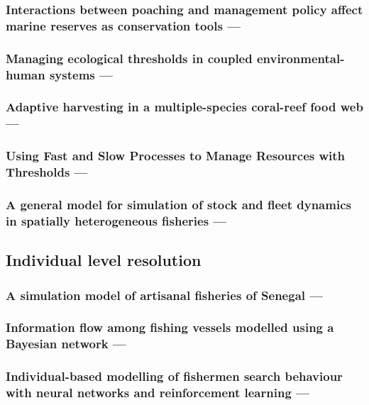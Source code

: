 \documentclass[12pt, a4paper]{article}
\begin{document}
\subsubsection{Interactions between poaching and management policy affect marine reserves as conservation tools --- \cite{SethiHilborn2008}}

\subsubsection{Managing ecological thresholds in coupled environmental-human systems --- \cite{Horanetal2011}}

\subsubsection{Adaptive harvesting in a multiple-species coral-reef food web --- \cite{Kramer2008}}

\subsubsection{Using Fast and Slow Processes to Manage Resources with Thresholds --- \cite{Crepin2007}}

\subsubsection{A general model for simulation of stock and fleet dynamics in spatially heterogeneous fisheries --- \cite{HilbornWalters1987}}

\subsection{Individual level resolution}

\subsubsection{A simulation model of artisanal fisheries of Senegal --- \cite{LaloeSamba1991}}

\subsubsection{Information flow among fishing vessels modelled using a Bayesian network --- \cite{Littleetal2004}}

\subsubsection{Individual-based modelling of fishermen search behaviour with neural networks and reinforcement learning --- \cite{DreyfusLeon1999}}
\end{document}
